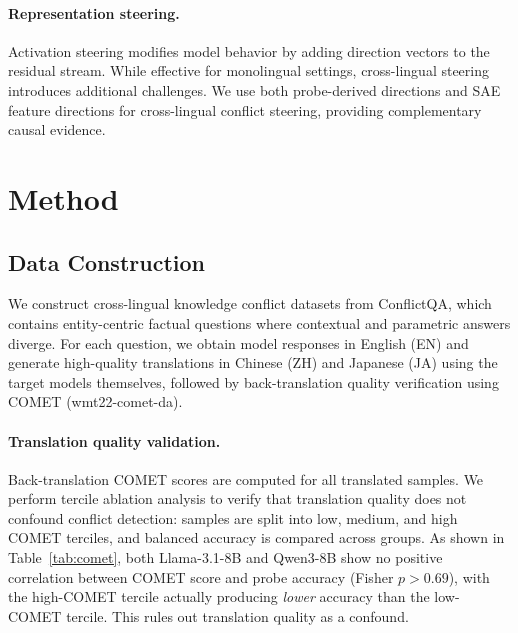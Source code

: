\documentclass{article}
\begin{document}
\paragraph{Representation steering.}
Activation steering modifies model behavior by adding direction vectors to the residual stream. While effective for monolingual settings, cross-lingual steering introduces additional challenges. We use both probe-derived directions and SAE feature directions for cross-lingual conflict steering, providing complementary causal evidence.

\section{Method}

\subsection{Data Construction}

We construct cross-lingual knowledge conflict datasets from ConflictQA, which contains entity-centric factual questions where contextual and parametric answers diverge. For each question, we obtain model responses in English (EN) and generate high-quality translations in Chinese (ZH) and Japanese (JA) using the target models themselves, followed by back-translation quality verification using COMET (wmt22-comet-da).

\paragraph{Translation quality validation.}
Back-translation COMET scores are computed for all translated samples. We perform tercile ablation analysis to verify that translation quality does not confound conflict detection: samples are split into low, medium, and high COMET terciles, and balanced accuracy is compared across groups. As shown in Table~\ref{tab:comet}, both Llama-3.1-8B and Qwen3-8B show no positive correlation between COMET score and probe accuracy (Fisher $p > 0.69$), with the high-COMET tercile actually producing \emph{lower} accuracy than the low-COMET tercile. This rules out translation quality as a confound.
\end{document}
